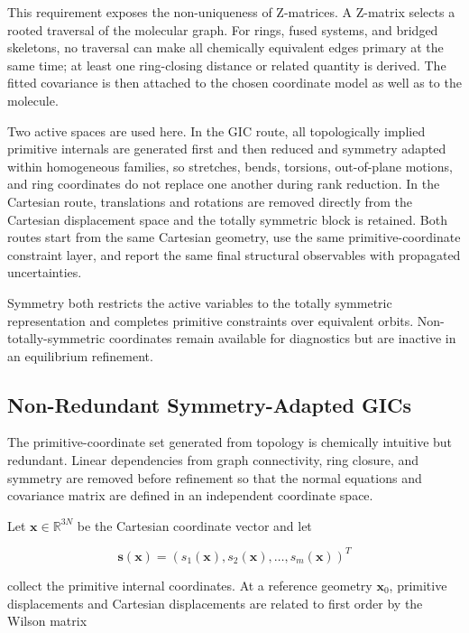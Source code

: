 \documentclass[journal=jctcce,manuscript=article,maxauthors=999]{achemso}
\begin{document}
This requirement exposes the non-uniqueness of Z-matrices. A Z-matrix selects
a rooted traversal of the molecular graph. For rings, fused systems, and
bridged skeletons, no traversal can make all chemically equivalent edges
primary at the same time; at least one ring-closing distance or related
quantity is derived. The fitted covariance is then attached to the chosen
coordinate model as well as to the molecule.

Two active spaces are used here. In the GIC route, all topologically implied
primitive internals are generated first and then reduced and symmetry adapted
within homogeneous families, so stretches, bends, torsions, out-of-plane
motions, and ring coordinates do not replace one another during rank
reduction.\cite{PulayFogarasi1992,Peng1996Redundant,Baker1996Delocalized,BakkenHelgaker2002}
In the Cartesian route, translations and rotations are removed directly from
the Cartesian displacement space and the totally symmetric block is retained.
Both routes start from the same Cartesian geometry, use the same
primitive-coordinate constraint layer, and report the same final structural
observables with propagated uncertainties.

Symmetry both restricts the active variables to the totally symmetric
representation and completes primitive constraints over equivalent orbits.
Non-totally-symmetric coordinates remain available for diagnostics but are
inactive in an equilibrium refinement.


\subsection{Non-Redundant Symmetry-Adapted GICs}

The primitive-coordinate set generated from topology is chemically intuitive
but redundant. Linear dependencies from graph connectivity, ring closure, and
symmetry are removed before refinement so that the normal equations and
covariance matrix are defined in an independent coordinate space.

Let $\mathbf{x}\in \mathbb{R}^{3N}$ be the Cartesian coordinate vector and let

\begin{equation}
\mathbf{s}(\mathbf{x}) =
(s_1(\mathbf{x}),s_2(\mathbf{x}),\ldots,s_m(\mathbf{x}))^T
\end{equation}

collect the primitive internal coordinates. At a reference geometry
$\mathbf{x}_0$, primitive displacements and Cartesian displacements are
related to first order by the Wilson matrix\cite{Wilson1955}
\end{document}
